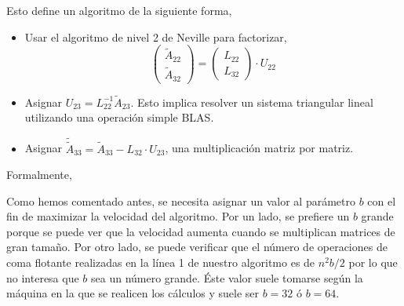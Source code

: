 \documentclass[a4paper,12pt]{article}
\begin{document}
Esto define un algoritmo de la siguiente forma, 

\begin{itemize}
	\item Usar el algoritmo de nivel 2 de Neville para factorizar,
	$$\begin{pmatrix} \widetilde{A}_{22}\\ \widetilde{A}_{32} 
\end{pmatrix} = \begin{pmatrix} L_{22} \\ L_{32} \end{pmatrix} \cdot U_{22}$$
	\item Asignar $U_{23} = L_{22}^{-1} \widetilde{A}_{23}$. Esto implica resolver un sistema triangular lineal utilizando una operaci\'on simple BLAS.
	\item Asignar $\widetilde{\widetilde{A}}_{33} = \widetilde{A}_{33} - L_{32}\cdot U_{23}$, una multiplicaci\'on matriz por matriz.
\end{itemize}

\bigskip

Formalmente,

\begin{algorithmic}[1]\label{neville3}
	\ENDFOR
\end{algorithmic}

\bigskip

Como hemos comentado antes, se necesita asignar un valor al par\'ametro $b$ con el fin de maximizar la velocidad del algoritmo. Por un lado, se prefiere un $b$ grande porque se puede ver que la velocidad aumenta cuando se multiplican matrices de gran tama\~no. Por otro lado, se puede verificar que el n\'umero de operaciones de coma flotante realizadas en la l\'inea 1 de nuestro algoritmo es de $n^2 b/2$ por lo que no interesa que $b$ sea un n\'umero grande. \'Este valor suele tomarse seg\'un la m\'aquina en la que se realicen los c\'alculos y suele ser $b=32$ \'o $b=64$.
\end{document}
